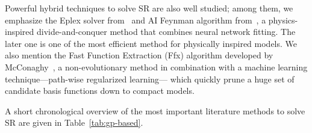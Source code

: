 \documentclass[a4paper,12pt]{elsarticle}
\begin{document}
	Powerful hybrid techniques to solve SR are also well studied; among them, we emphasize the Eplex solver from~\cite{la2019probabilistic,la2016epsilon} and AI Feynman algorithm from~\cite{udrescu2020ai}, a physics-inspired divide-and-conquer method that  combines neural network
	fitting. The later one is one of the most efficient method for physically inspired models. We also mention the Fast Function Extraction (Ffx) algorithm developed by McConaghy~\cite{mcconaghy2011ffx},  a non-evolutionary method in combination with a machine learning technique---path-wise regularized learning--- which   quickly prune a huge set of candidate basis functions down to compact models.
	
	A short chronological overview of the most important  literature methods to solve SR are given in Table~\ref{tab:gp-based}. 
	
\end{document}
